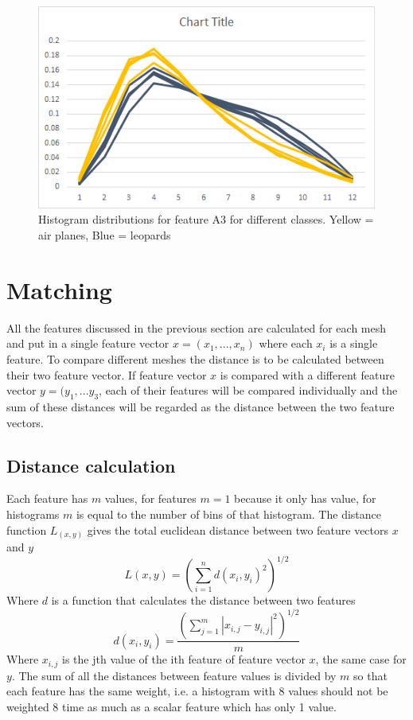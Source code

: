 \documentclass{bigdata}
\begin{document}
\begin{figure}[h!]
    \includegraphics[width=\linewidth]{Pictures/Part3/A3.png}
    \caption{Histogram distributions for feature A3 for different classes. Yellow = air planes, Blue = leopards}
  \label{fig:eccentricity}
\end{figure}

\section{Matching}
All the features discussed in the previous section are calculated for each mesh and put in a single feature vector $x = (x_1,...,x_n)$ where each $x_i$ is a single feature. To compare different meshes the distance is to be calculated between their two feature vector. If feature vector $x$ is compared with a different feature vector $y = (y_1,...y_3$, each of their features will be compared individually and the sum of these distances will be regarded as the distance between the two feature vectors.

\subsection{Distance calculation}
Each feature has $m$ values, for  features $m = 1$ because it only has value, for histograms $m$ is equal to the number of bins of that histogram. The distance function $L_(x,y)$ gives the total euclidean distance between two feature vectors $x$ and $y$
\begin{equation}
L(x,y) = \left(\sum\limits_{i=1}^nd(x_i,y_i)^2\right)^{1/2}
\end{equation}
Where $d$ is a function that calculates the distance between two features
\begin{equation}
d(x_i,y_i) = \frac{\left(\sum\limits_{j=1}^m|x_{i,j}-y_{i,j}|^2\right)^{1/2}}{m}
\end{equation}
Where $x_{i,j}$ is the jth value of the ith feature of feature vector $x$, the same case for $y$. The sum of all the distances between feature values is divided by $m$ so that each feature has the same weight, i.e. a histogram with 8 values should not be weighted 8 time as much as a scalar feature which has only 1 value.  
\end{document}
